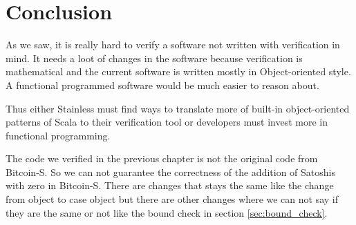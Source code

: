 \chapter{Conclusion}
\label{chap:conclusion}

As we saw, it is really hard to verify a software not written with verification in mind.
It needs a loot of changes in the software because verification is mathematical and the current software is written mostly in Object-oriented style.
A functional programmed software would be much easier to reason about.

Thus either Stainless must find ways to translate more of built-in object-oriented patterns of Scala to their verification tool or developers must invest more in functional programming.

The code we verified in the previous chapter is not the original code from Bitcoin-S.
So we can not guarantee the correctness of the addition of Satoshis with zero in Bitcoin-S.
There are changes that stays the same like the change from object to case object but there are other changes where we can not say if they are the same or not like the bound check in section \ref{sec:bound_check}.
